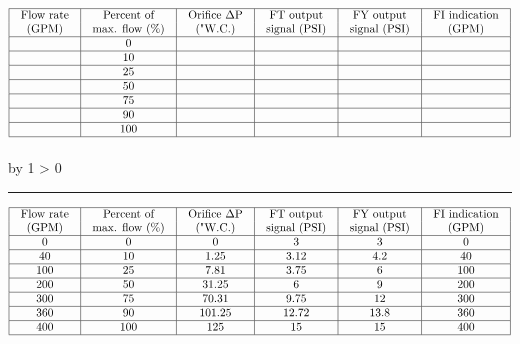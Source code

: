 \documentclass[12pt,a4paper]{article}
\def\svar{
           \advance\answnum by 1
           \ifnum \answnum > 0
                \hrule
                \vskip 3pt
                \leftline{Svar \the\answnum}
                \vskip 3pt \fi}
\begin{document}

$$\vbox{\offinterlineskip
\halign{\strut
\vrule \quad\hfil # \ \hfil & 
\vrule \quad\hfil # \ \hfil & 
\vrule \quad\hfil # \ \hfil & 
\vrule \quad\hfil # \ \hfil & 
\vrule \quad\hfil # \ \hfil & 
\vrule \quad\hfil # \ \hfil \vrule \cr
\noalign{\hrule}
%
Flow rate & Percent of & Orifice $\Delta$P & FT output & FY output & FI indication \cr
%
(GPM) & max. flow (\%) & ("W.C.) & signal (PSI) & signal (PSI) & (GPM) \cr
%
\noalign{\hrule}
%
 & 0 &   &   &   &  \cr
%
\noalign{\hrule}
%
  & 10 &   &   &   &  \cr
%
\noalign{\hrule}
%
  & 25 &   &   &   &  \cr
%
\noalign{\hrule}
%
 & 50 &   &   &   &  \cr
%
\noalign{\hrule}
%
  & 75 &   &   &   &  \cr
%
\noalign{\hrule}
%
  & 90 &   &   &   &  \cr
%
\noalign{\hrule}
%
 & 100 &   &   &   &  \cr
%
\noalign{\hrule}
} %
}$$ %

\vskip 10pt \filbreak 





\svar{} 


$$\vbox{\offinterlineskip
\halign{\strut
\vrule \quad\hfil # \ \hfil & 
\vrule \quad\hfil # \ \hfil & 
\vrule \quad\hfil # \ \hfil & 
\vrule \quad\hfil # \ \hfil & 
\vrule \quad\hfil # \ \hfil & 
\vrule \quad\hfil # \ \hfil \vrule \cr
\noalign{\hrule}
%
Flow rate & Percent of & Orifice $\Delta$P & FT output & FY output & FI indication \cr
%
(GPM) & max. flow (\%) & ("W.C.) & signal (PSI) & signal (PSI) & (GPM) \cr
%
\noalign{\hrule}
%
0 & 0 & 0 & 3 & 3 & 0 \cr
%
\noalign{\hrule}
%
40 & 10 & 1.25 & 3.12 & 4.2 & 40 \cr
%
\noalign{\hrule}
%
100 & 25 & 7.81 & 3.75 & 6 & 100 \cr
%
\noalign{\hrule}
%
200 & 50 & 31.25 & 6 & 9 & 200 \cr
%
\noalign{\hrule}
%
300 & 75 & 70.31 & 9.75 & 12 & 300 \cr
%
\noalign{\hrule}
%
360 & 90 & 101.25 & 12.72 & 13.8 & 360 \cr
%
\noalign{\hrule}
%
400 & 100 & 125 & 15 & 15 & 400 \cr
%
\noalign{\hrule}
} %
}$$ %


\vskip 10pt \filbreak 
\end{document}
